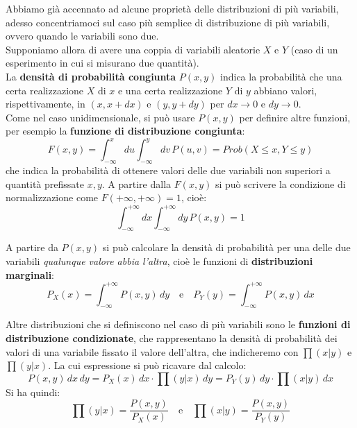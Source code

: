 \documentclass[openany,a4paper,12pt]{book}
\theoremstyle{remark}
\begin{document}
Abbiamo già accennato ad alcune proprietà delle distribuzioni di più variabili, adesso concentriamoci sul caso più semplice di distribuzione di più variabili, ovvero quando le variabili sono due.\\
Supponiamo allora di avere una coppia di variabili aleatorie $X$ e $Y$ (caso di un esperimento in cui si misurano due quantità).
\\
La \textbf{densità di probabilità congiunta} $P(x,y)$ indica la probabilità che una certa realizzazione $X$ di $x$ e una certa realizzazione $Y$ di $y$ abbiano valori, rispettivamente, in $(x, x+dx)$ e $(y, y+dy)$ per $dx \to 0$ e $dy \to 0$.
\\
Come nel caso unidimensionale, si può usare $P(x,y)$ per definire altre funzioni, per esempio la \textbf{funzione di distribuzione congiunta}:
\begin{equation}
    F(x,y) = \int_{-\infty}^{x} du \int_{-\infty}^{y} dv \, P(u,v) = Prob(X \le x, Y \le y)
\end{equation}
che indica la probabilità di ottenere valori delle due variabili non superiori a quantità prefissate $x, y$. A partire dalla $F(x,y)$ si può scrivere la condizione di normalizzazione come $F(+\infty, +\infty) = 1$, cioè:
\begin{equation}
    \int_{-\infty}^{+\infty} dx \int_{-\infty}^{+\infty} dy \, P(x,y) = 1
\end{equation}


A partire da $P(x,y)$ si può calcolare la densità di probabilità per una delle due variabili \textit{qualunque valore abbia l'altra}, cioè le funzioni di \textbf{distribuzioni marginali}:
\begin{equation}
    P_X(x) = \int_{-\infty}^{+\infty} P(x,y) \,dy \quad \text{e} \quad P_Y(y) = \int_{-\infty}^{+\infty} P(x,y) \,dx
\end{equation}

Altre distribuzioni che si definiscono nel caso di più variabili sono le \textbf{funzioni di distribuzione condizionate}, che rappresentano la densità di probabilità dei valori di una variabile fissato il valore dell'altra, che indicheremo con $\prod(x|y)$ e $\prod(y|x)$. La cui espressione si può ricavare dal calcolo:
\begin{equation}
    P(x,y)\,dx\,dy = P_X(x)\,dx \cdot \prod(y|x)\,dy = P_Y(y)\,dy \cdot \prod(x|y)\,dx
\end{equation}
Si ha quindi:
\begin{equation}
    \prod(y|x) = \frac{P(x,y)}{P_X(x)} \quad \text{e} \quad \prod(x|y) = \frac{P(x,y)}{P_Y(y)}
\end{equation}
\end{document}
